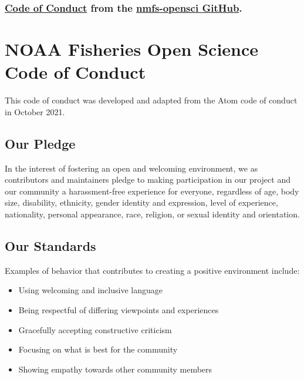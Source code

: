 \documentclass[
  letterpaper,
  oneside,
  open=any]{scrbook}
\providecommand{\tightlist}{%
  \setlength{\itemsep}{0pt}\setlength{\parskip}{0pt}}\usepackage{longtable,booktabs,array}
\begin{document}
\subsection{\texorpdfstring{\href{https://github.com/nmfs-opensci/.github/blob/main/CODE_OF_CONDUCT.md}{Code
of Conduct} from the \href{https://nmfs-opensci.github.io/}{nmfs-opensci
GitHub}.}{Code of Conduct from the nmfs-opensci GitHub.}}\label{code-of-conduct-from-the-nmfs-opensci-github.}

\chapter{NOAA Fisheries Open Science Code of
Conduct}\label{noaa-fisheries-open-science-code-of-conduct}

This code of conduct was developed and adapted from the Atom code of
conduct in October 2021.

\section{Our Pledge}\label{our-pledge}

In the interest of fostering an open and welcoming environment, we as
contributors and maintainers pledge to making participation in our
project and our community a harassment-free experience for everyone,
regardless of age, body size, disability, ethnicity, gender identity and
expression, level of experience, nationality, personal appearance, race,
religion, or sexual identity and orientation.

\section{Our Standards}\label{our-standards}

Examples of behavior that contributes to creating a positive environment
include:

\begin{itemize}
\tightlist
\item
  Using welcoming and inclusive language
\item
  Being respectful of differing viewpoints and experiences
\item
  Gracefully accepting constructive criticism
\item
  Focusing on what is best for the community
\item
  Showing empathy towards other community members
\end{itemize}
\end{document}
